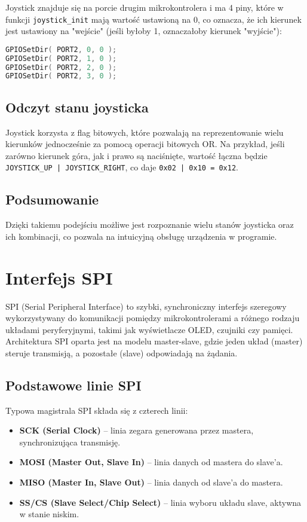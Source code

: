 \documentclass[a4paper,12pt]{report}
\begin{document}
Joystick znajduje się na porcie drugim mikrokontrolera i ma 4 piny, które w funkcji \texttt{joystick\_init} mają wartość ustawioną na 0, co oznacza, że ich kierunek jest ustawiony na "wejście" (jeśli byłoby 1, oznaczałoby kierunek "wyjście"):
\begin{lstlisting}[language=C]
GPIOSetDir( PORT2, 0, 0 );
GPIOSetDir( PORT2, 1, 0 );
GPIOSetDir( PORT2, 2, 0 );
GPIOSetDir( PORT2, 3, 0 );
\end{lstlisting}

\subsection*{Odczyt stanu joysticka}

Joystick korzysta z flag bitowych, które pozwalają na reprezentowanie wielu kierunków jednocześnie za pomocą operacji bitowych OR. Na przykład, jeśli zarówno kierunek góra, jak i prawo są naciśnięte, wartość łączna będzie \texttt{JOYSTICK\_UP | JOYSTICK\_RIGHT}, co daje \texttt{0x02 | 0x10 = 0x12}.

\subsection*{Podsumowanie}

Dzięki takiemu podejściu możliwe jest rozpoznanie wielu stanów joysticka oraz ich kombinacji, co pozwala na intuicyjną obsługę urządzenia w programie.

\section{Interfejs SPI}

SPI (Serial Peripheral Interface) to szybki, synchroniczny interfejs szeregowy wykorzystywany do komunikacji pomiędzy mikrokontrolerami a różnego rodzaju układami peryferyjnymi, takimi jak wyświetlacze OLED, czujniki czy pamięci. Architektura SPI oparta jest na modelu master-slave, gdzie jeden układ (master) steruje transmisją, a pozostałe (slave) odpowiadają na żądania.

\subsection*{Podstawowe linie SPI}

Typowa magistrala SPI składa się z czterech linii:
\begin{itemize}
    \item \textbf{SCK (Serial Clock)} – linia zegara generowana przez mastera, synchronizująca transmisję.
    \item \textbf{MOSI (Master Out, Slave In)} – linia danych od mastera do slave'a.
    \item \textbf{MISO (Master In, Slave Out)} – linia danych od slave'a do mastera.
    \item \textbf{SS/CS (Slave Select/Chip Select)} – linia wyboru układu slave, aktywna w stanie niskim.
\end{itemize}
\end{document}
